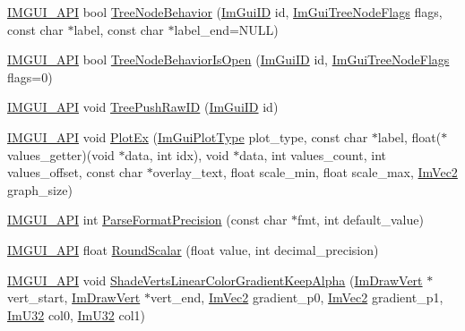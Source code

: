 \begin{DoxyCompactItemize}
\item 
\mbox{\hyperlink{imgui_8h_a43829975e84e45d1149597467a14bbf5}{I\+M\+G\+U\+I\+\_\+\+A\+PI}} bool \mbox{\hyperlink{namespace_im_gui_a918eabf70d288e93b2519ee1eac2c0b4}{Tree\+Node\+Behavior}} (\mbox{\hyperlink{imgui_8h_a1785c9b6f4e16406764a85f32582236f}{Im\+Gui\+ID}} id, \mbox{\hyperlink{imgui_8h_a0588fdd10c59b49a0159484fe9ec4564}{Im\+Gui\+Tree\+Node\+Flags}} flags, const char $\ast$label, const char $\ast$label\+\_\+end=N\+U\+LL)
\item 
\mbox{\hyperlink{imgui_8h_a43829975e84e45d1149597467a14bbf5}{I\+M\+G\+U\+I\+\_\+\+A\+PI}} bool \mbox{\hyperlink{namespace_im_gui_a22cc50485aad6da8a3a4e156b500ed4a}{Tree\+Node\+Behavior\+Is\+Open}} (\mbox{\hyperlink{imgui_8h_a1785c9b6f4e16406764a85f32582236f}{Im\+Gui\+ID}} id, \mbox{\hyperlink{imgui_8h_a0588fdd10c59b49a0159484fe9ec4564}{Im\+Gui\+Tree\+Node\+Flags}} flags=0)
\item 
\mbox{\hyperlink{imgui_8h_a43829975e84e45d1149597467a14bbf5}{I\+M\+G\+U\+I\+\_\+\+A\+PI}} void \mbox{\hyperlink{namespace_im_gui_afddcddce9f2801769e4c79ef769ab600}{Tree\+Push\+Raw\+ID}} (\mbox{\hyperlink{imgui_8h_a1785c9b6f4e16406764a85f32582236f}{Im\+Gui\+ID}} id)
\item 
\mbox{\hyperlink{imgui_8h_a43829975e84e45d1149597467a14bbf5}{I\+M\+G\+U\+I\+\_\+\+A\+PI}} void \mbox{\hyperlink{namespace_im_gui_a0a18ae07b294d5667f95a5c003d2efb6}{Plot\+Ex}} (\mbox{\hyperlink{imgui__internal_8h_a9d5efcdd8895aa3544f1e8ce366c2728}{Im\+Gui\+Plot\+Type}} plot\+\_\+type, const char $\ast$label, float($\ast$values\+\_\+getter)(void $\ast$data, int idx), void $\ast$data, int values\+\_\+count, int values\+\_\+offset, const char $\ast$overlay\+\_\+text, float scale\+\_\+min, float scale\+\_\+max, \mbox{\hyperlink{struct_im_vec2}{Im\+Vec2}} graph\+\_\+size)
\item 
\mbox{\hyperlink{imgui_8h_a43829975e84e45d1149597467a14bbf5}{I\+M\+G\+U\+I\+\_\+\+A\+PI}} int \mbox{\hyperlink{namespace_im_gui_a40943047a2f8cad978fabffcbd26805f}{Parse\+Format\+Precision}} (const char $\ast$fmt, int default\+\_\+value)
\item 
\mbox{\hyperlink{imgui_8h_a43829975e84e45d1149597467a14bbf5}{I\+M\+G\+U\+I\+\_\+\+A\+PI}} float \mbox{\hyperlink{namespace_im_gui_ab1826c569a8f3296b9723a2148013d28}{Round\+Scalar}} (float value, int decimal\+\_\+precision)
\item 
\mbox{\hyperlink{imgui_8h_a43829975e84e45d1149597467a14bbf5}{I\+M\+G\+U\+I\+\_\+\+A\+PI}} void \mbox{\hyperlink{namespace_im_gui_a7880876c5072e610be8f8e898d2a8866}{Shade\+Verts\+Linear\+Color\+Gradient\+Keep\+Alpha}} (\mbox{\hyperlink{struct_im_draw_vert}{Im\+Draw\+Vert}} $\ast$vert\+\_\+start, \mbox{\hyperlink{struct_im_draw_vert}{Im\+Draw\+Vert}} $\ast$vert\+\_\+end, \mbox{\hyperlink{struct_im_vec2}{Im\+Vec2}} gradient\+\_\+p0, \mbox{\hyperlink{struct_im_vec2}{Im\+Vec2}} gradient\+\_\+p1, \mbox{\hyperlink{imgui_8h_a118cff4eeb8d00e7d07ce3d6460eed36}{Im\+U32}} col0, \mbox{\hyperlink{imgui_8h_a118cff4eeb8d00e7d07ce3d6460eed36}{Im\+U32}} col1)

\end{DoxyCompactItemize}
